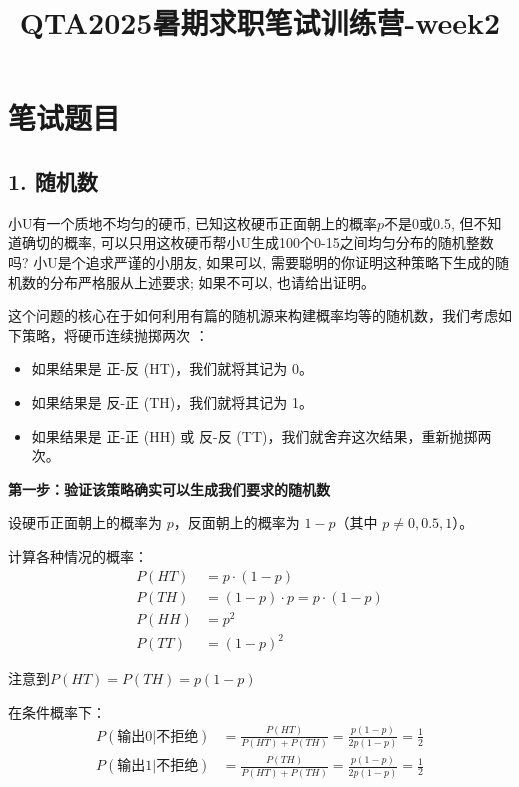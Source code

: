 \documentclass[UTF8]{ctexart}
\title{QTA2025暑期求职笔试训练营-week2}
\author{}
\date{}
\begin{document}
\maketitle

\section*{笔试题目}

\subsection*{1. 随机数}
小U有一个质地不均匀的硬币, 已知这枚硬币正面朝上的概率$p$不是0或0.5, 但不知道确切的概率, 可以只用这枚硬币帮小U生成100个0-15之间均匀分布的随机整数吗? 小U是个追求严谨的小朋友, 如果可以, 需要聪明的你证明这种策略下生成的随机数的分布严格服从上述要求; 如果不可以, 也请给出证明。

这个问题的核心在于如何利用有篇的随机源来构建概率均等的随机数，我们考虑如下策略，将硬币连续抛掷两次 ：
\begin{itemize}
    \item 如果结果是 正-反 (HT)，我们就将其记为 0。

    \item 如果结果是 反-正 (TH)，我们就将其记为 1。
    
    \item 如果结果是 正-正 (HH) 或 反-反 (TT)，我们就舍弃这次结果，重新抛掷两次。    
    
\end{itemize}

\textbf{第一步：验证该策略确实可以生成我们要求的随机数}

设硬币正面朝上的概率为 $p$，反面朝上的概率为 $1-p$（其中 $p \neq 0, 0.5, 1$）。

计算各种情况的概率：
\begin{align}
P(HT) &= p \cdot (1-p) \\
P(TH) &= (1-p) \cdot p = p \cdot (1-p) \\
P(HH) &= p^2 \\
P(TT) &= (1-p)^2
\end{align}

注意到$P(HT) = P(TH) = p(1-p)$

在条件概率下：
\begin{align}
P(\text{输出0} | \text{不拒绝}) &= \frac{P(HT)}{P(HT) + P(TH)} =
\frac{p(1-p)}{2p(1-p)} = \frac{1}{2} \\
P(\text{输出1} | \text{不拒绝}) &= \frac{P(TH)}{P(HT) + P(TH)} =
\frac{p(1-p)}{2p(1-p)} = \frac{1}{2}
\end{align}
\end{document}
